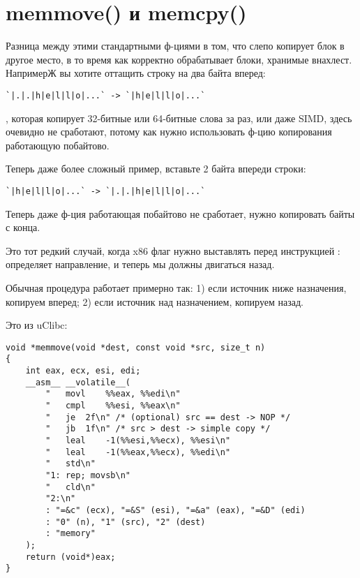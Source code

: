 \section{memmove() и memcpy()}
\label{memmove_and_DF}

Разница между этими стандартными ф-циями в том, что 
 слепо копирует блок в другое место,
в то время как  корректно обрабатывает блоки, хранимые внахлест.
НапримерЖ вы хотите оттащить строку на два байта вперед:

\begin{lstlisting}
`|.|.|h|e|l|l|o|...` -> `|h|e|l|l|o|...`
\end{lstlisting}

, которая копирует 32-битные или 64-битные слова за раз, или даже \ac{SIMD},
здесь очевидно не сработают, потому как нужно использовать ф-цию копирования работающую побайтово.

Теперь даже более сложный пример, вставьте 2 байта впереди строки:

\begin{lstlisting}
`|h|e|l|l|o|...` -> `|.|.|h|e|l|l|o|...`
\end{lstlisting}

Теперь даже ф-ция работающая побайтово не сработает, нужно копировать байты с конца.

Это тот редкий случай, когда x86 флаг  нужно выставлять перед инструкцией :
 определяет направление, и теперь мы должны двигаться назад.

Обычная процедура  работает примерно так:
1) если источник ниже назначения, копируем вперед;
2) если источник над назначением, копируем назад.

Это  из uClibc:

\begin{lstlisting}[style=customc]
void *memmove(void *dest, const void *src, size_t n)
{
	int eax, ecx, esi, edi;
	__asm__ __volatile__(
		"	movl	%%eax, %%edi\n"
		"	cmpl	%%esi, %%eax\n"
		"	je	2f\n" /* (optional) src == dest -> NOP */
		"	jb	1f\n" /* src > dest -> simple copy */
		"	leal	-1(%%esi,%%ecx), %%esi\n"
		"	leal	-1(%%eax,%%ecx), %%edi\n"
		"	std\n"
		"1:	rep; movsb\n"
		"	cld\n"
		"2:\n"
		: "=&c" (ecx), "=&S" (esi), "=&a" (eax), "=&D" (edi)
		: "0" (n), "1" (src), "2" (dest)
		: "memory"
	);
	return (void*)eax;
}
\end{lstlisting}

